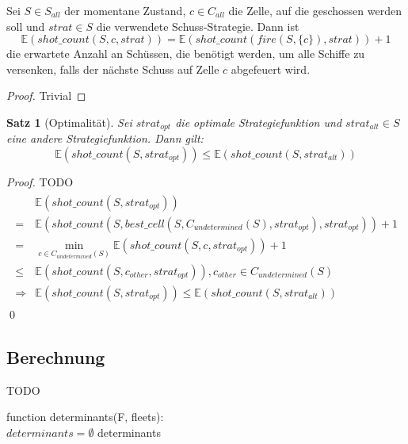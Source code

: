 \documentclass[a4paper,12pt]{llncs}
\numberwithin{equation}{section}
\newtheorem{satz}{Satz}
\begin{document}
\begin{lemma}
Sei $S\in S_{all}$ der momentane Zustand, $c\in C_{all}$ die Zelle, auf die geschossen werden soll und $strat \in S$ die verwendete Schuss-Strategie.
Dann ist
\[
\mathds{E}(shot\_count(S, c, strat))=\mathds{E}(shot\_count(fire(S, \{c\}), strat)) + 1
\]
die erwartete Anzahl an Schüssen, die benötigt werden, um alle Schiffe zu versenken, falls der nächste Schuss auf Zelle $c$ abgefeuert wird.
\end{lemma}

\begin{proof}
Trivial
\end{proof}



\begin{satz}[Optimalität]
Sei $strat_{opt}$ die optimale Strategiefunktion und $strat_{alt} \in S$ eine andere Strategiefunktion.
Dann gilt:
\[
\mathds{E}(shot\_count(S, strat_{opt})) \leq \mathds{E}(shot\_count(S, strat_{alt}))
\]
\end{satz}

\begin{proof}
TODO
\begin{align}
\begin{split}
&\mathds{E}(shot\_count(S, strat_{opt}))\\
=&\mathds{E}(shot\_count(S, best\_cell(S, C_{undetermined}(S), strat_{opt}), strat_{opt})) + 1\\
=&\min_{c \in C_{undetermined}(S)} \mathds{E}(shot\_count(S, c, strat_{opt})) + 1\\
\leq & \mathds{E}(shot\_count(S, c_{other}, strat_{opt})), c_{other} \in C_{undetermined}(S)\\
\Rightarrow &\mathds{E}(shot\_count(S, strat_{opt})) \leq \mathds{E}(shot\_count(S, strat_{alt}))
\end{split}
\end{align}
\qed
\end{proof}

\subsection{Berechnung}


TODO

\begin{algorithm}[H]
 function determinants(F, fleets):\\
 $determinants=\emptyset$\;
 \Return determinants\;
\end{algorithm}
\end{document}
